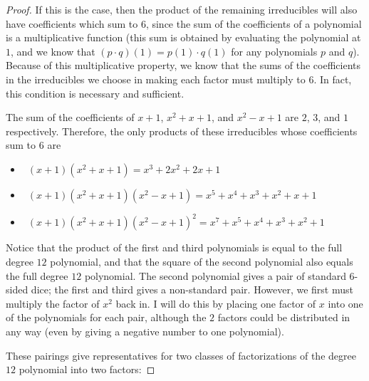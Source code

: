 \documentclass[12pt]{article}
\begin{document}
\begin{enumerate}[leftmargin=0cm,itemindent=.5cm,labelwidth=\itemindent,labelsep=0cm,align=left]
\begin{proof}
If this is the case, then the product of the remaining irreducibles will also have coefficients which sum to $6$, since the sum of the coefficients of a polynomial is a multiplicative function (this sum is obtained by evaluating the polynomial at $1$, and we know that $(p \cdot q)(1) = p(1)\cdot q(1)$ for any polynomials $p$ and $q$).  Because of this multiplicative property, we know that the sums of the coefficients in the irreducibles we choose in making each factor must multiply to $6$.  In fact, this condition is necessary and sufficient.

The sum of the coefficients of $x+1$, $x^2 + x + 1$, and $x^2 - x + 1$ are $2$, $3$, and $1$ respectively.  Therefore, the only products of these irreducibles whose coefficients sum to 6 are
\begin{itemize}
\item \ $(x+1)(x^2 + x + 1) = x^3 + 2x^2 + 2x + 1$
\item \ $(x+1)(x^2 + x + 1)(x^2 - x + 1) = x^5 + x^4 + x^3 + x^2 + x + 1$
\item \ $(x+1)(x^2 + x + 1)(x^2 - x + 1)^2 = x^7 + x^5 + x^4 + x^3 + x^2 + 1$
\end{itemize}
Notice that the product of the first and third polynomials is equal to the full degree $12$ polynomial, and that the square of the second polynomial also equals the full degree $12$ polynomial.  The second polynomial gives a pair of standard $6$-sided dice; the first and third gives a non-standard pair.  However, we first must multiply the factor of $x^2$ back in.  I will do this by placing one factor of $x$ into one of the polynomials for each pair, although the $2$ factors could be distributed in any way (even by giving a negative number to one polynomial).

These pairings give representatives for two classes of factorizations of the degree $12$ polynomial into two factors:


\end{proof}
\end{enumerate}
\end{document}
